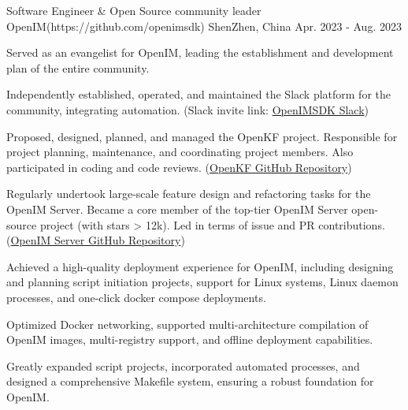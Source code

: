 

\begin{cventries}

  \cventry
    {Software Engineer \& Open Source community leader} %
    {OpenIM(https://github.com/openimsdk)} %
    {ShenZhen, China} %
    {Apr. 2023 - Aug. 2023} %
    {
      \begin{cvitems} %
        \item {Served as an evangelist for OpenIM, leading the establishment and development plan of the entire community.}
        \item {Independently established, operated, and maintained the Slack platform for the community, integrating automation. (Slack invite link: \href{https://join.slack.com/t/openimsdk/shared_invite/zt-22720d66b-o_FvKxMTGXtcnnnHiMqe9Q}{OpenIMSDK Slack})}
        \item {Proposed, designed, planned, and managed the OpenKF project. Responsible for project planning, maintenance, and coordinating project members. Also participated in coding and code reviews. (\href{https://github.com/OpenIMSDK/OpenKF}{OpenKF GitHub Repository})}
        \item {Regularly undertook large-scale feature design and refactoring tasks for the OpenIM Server. Became a core member of the top-tier OpenIM Server open-source project (with stars > 12k). Led in terms of issue and PR contributions. (\href{https://github.com/OpenIMSDK/Open-IM-Server}{OpenIM Server GitHub Repository})}
        \item {Achieved a high-quality deployment experience for OpenIM, including designing and planning script initiation projects, support for Linux systems, Linux daemon processes, and one-click docker compose deployments.}
        \item {Optimized Docker networking, supported multi-architecture compilation of OpenIM images, multi-registry support, and offline deployment capabilities.}
        \item {Greatly expanded script projects, incorporated automated processes, and designed a comprehensive Makefile system, ensuring a robust foundation for OpenIM.}

\end{cvitems}}
\end{cventries}

